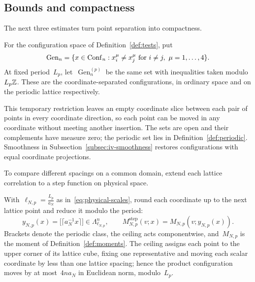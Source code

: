 \subsection{Bounds and compactness}\label{subsec:iv-compactness}

The next three estimates turn point separation into compactness.

\begin{definition}\label{def:iv-coordinate-separated}
For the configuration space of Definition~\ref{def:tests}, put
\begin{equation}\label{eq:iv-coordinate-separated}
 \operatorname{Gen}_n
 =\{x\in\operatorname{Conf}_{n}:x_i^\mu\ne x_j^\mu
       \text{ for }i\ne j,\ \mu=1,\ldots,4\}.
\end{equation}
At fixed period~$L_p$, let~$\operatorname{Gen}^{(p)}_n$ be the same set with inequalities taken modulo~$L_p\mathbb Z$.
These are the coordinate-separated configurations, in ordinary space and on the periodic lattice respectively.
\end{definition}

This temporary restriction leaves an empty coordinate slice between each pair of points in every coordinate direction, so each point can be moved in any coordinate without meeting another insertion. The sets are open and their complements have measure zero; the periodic set lies in Definition~\ref{def:periodic}. Smoothness in Subsection~\ref{subsec:iv-smoothness} restores configurations with equal coordinate projections.

To compare different spacings on a common domain, extend each lattice correlation to a step function on physical space.

\begin{definition}\label{def:iv-grid}
With~$\ell_{N,p}=\frac{L_p}{a_N}$ as in~\eqref{eq:physical-scales}, round each coordinate up to the next lattice point and reduce it modulo the period:
\begin{equation}\label{eq:iv-step}
 y_{N,p}(x)=\bigl[\lceil a_N^{-1}x\rceil\bigr]
       \in\Lambda_{\ell_{N,p}}^n,\qquad
 M^{\mathrm{step}}_{N,p}(v;x)=M_{N,p}(v;y_{N,p}(x)).
\end{equation}
Brackets denote the periodic class, the ceiling acts componentwise, and~$M_{N,p}$ is the moment of Definition~\ref{def:moments}. The ceiling assigns each point to the upper corner of its lattice cube, fixing one representative and moving each scalar coordinate by less than one lattice spacing; hence the product configuration moves by at most~$4na_N$ in Euclidean norm, modulo~$L_p$.
\end{definition}


